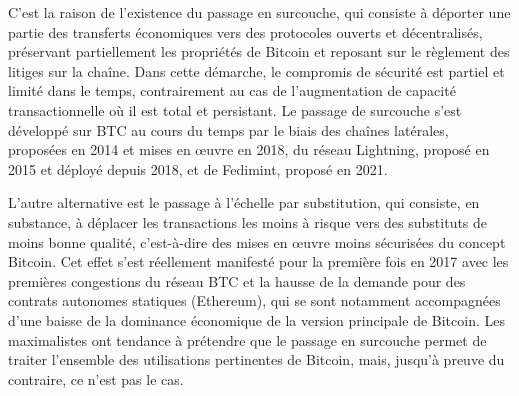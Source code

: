 C'est la raison de l'existence du passage en surcouche, qui consiste à déporter une partie des transferts économiques vers des protocoles ouverts et décentralisés, préservant partiellement les propriétés de Bitcoin et reposant sur le règlement des litiges sur la chaîne. Dans cette démarche, le compromis de sécurité est partiel et limité dans le temps, contrairement au cas de l'augmentation de capacité transactionnelle où il est total et persistant. Le passage de surcouche s'est développé sur BTC au cours du temps par le biais des chaînes latérales, proposées en 2014 et mises en œuvre en 2018, du réseau Lightning, proposé en 2015 et déployé depuis 2018, et de Fedimint, proposé en 2021.

L'autre alternative est le passage à l'échelle par substitution, qui consiste, en substance, à déplacer les transactions les moins à risque vers des substituts de moins bonne qualité, c'est-à-dire des mises en œuvre moins sécurisées du concept Bitcoin. Cet effet s'est réellement manifesté pour la première fois en 2017 avec les premières congestions du réseau BTC et la hausse de la demande pour des contrats autonomes statiques (Ethereum), qui se sont notamment accompagnées d'une baisse de la dominance économique de la version principale de Bitcoin. Les maximalistes ont tendance à prétendre que le passage en surcouche permet de traiter l'ensemble des utilisations pertinentes de Bitcoin, mais, jusqu'à preuve du contraire, ce n'est pas le cas.
